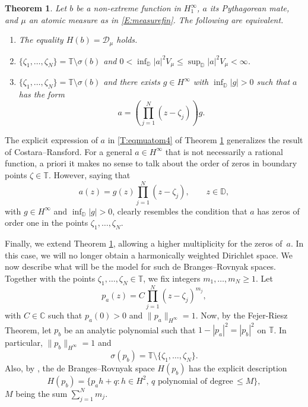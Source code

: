 \documentclass[12pt]{amsart}
\newtheorem{theorem2}{Theorem}
\theoremstyle{definition}
\theoremstyle{remark}
\theoremstyle{remark}
\begin{document}
\begin{theorem2} \label{T:equalitymuatom}
     Let $b$ be a non-extreme function in $H^\infty_1$, $a$ its Pythagorean mate, and $\mu$ an atomic measure as in \eqref{E:measurefin}. The following are equivalent.
      \begin{enumerate}[label={\rm (\Alph*)}]
         \item \label{T:eqmuatom1} The equality $H(b) = \mathcal{D}_\mu$ holds.
         \item \label{T:eqmuatom2} $\{\zeta_1,\ldots,\zeta_N\}= \mathbb{T} \setminus \sigma(b)$ and $0<\inf_{\mathbb{D}}|a|^2 V_\mu\leq\sup_{\mathbb{D}} |a|^2 V_\mu < \infty$.
          \item \label{T:eqmuatom4} $\{ \zeta_1, \ldots, \zeta_N \}= \mathbb{T} \setminus \sigma(b)$ and there exists $g\in H^\infty$ with $\inf_\mathbb{D}|g|>0$ such that $a$ has the form 
         \begin{equation*}
             a=\left(\prod_{j=1}^N (z-\zeta_j)\right) g.
         \end{equation*}
     \end{enumerate}
 \end{theorem2}



The explicit expression of $a$ in \ref{T:eqmuatom4} of Theorem \ref{T:equalitymuatom} generalizes the result of Costara--Ransford. For a general $a\in H^\infty$ that is not necessarily a rational function, a priori it makes no sense to talk about the order of zeros in boundary points $\zeta\in\mathbb{T}$. However, saying that 
\[a(z)=g(z)\prod_{j=1}^N(z-\zeta_j), \qquad z\in\mathbb{D},\]
with $g\in H^\infty$ and $\inf_\mathbb{D}|g|>0$, clearly resembles the condition that $a$ has zeros of order one in the points $\zeta_1,\ldots,\zeta_N$. 

Finally, we extend Theorem \ref{T:equalitymuatom}, allowing a higher multiplicity for the zeros of~$a$. In this case, we will no longer obtain a harmonically weighted Dirichlet space. We now describe what will be the model for such de Branges--Rovnyak spaces. Together with the points $\zeta_1,\ldots,\zeta_N\in\mathbb{T}$, we fix integers $m_1,\ldots,m_N \geq 1$. Let 
\[p_a(z)=C\prod_{j=1}^N(z-\zeta_j)^{m_j},\]
with $C\in\mathbb{C}$ such that $p_a(0)>0$ and $\|p_a\|_{H^\infty}=1$. Now, by the Fejer-Riesz Theorem, let $p_b$ be an analytic polynomial such that $1-|p_a|^2=|p_b|^2$ on $\mathbb{T}$. In particular, $\|p_b\|_{H^\infty}=1$ and 
\[\sigma(p_b)=\mathbb{T}\setminus \{\zeta_1,\ldots,\zeta_N\}.\]
Also, by \cite{concrete}, the de Branges--Rovnyak space $H(p_b)$ has the explicit description
\[H(p_b)=\{p_ah+ q\colon h\in H^2,\, q\,\,\text{polynomial of degree}\,\leq M\},\]
$M$ being the sum $\sum_{j=1}^N m_j$. 
\end{document}

